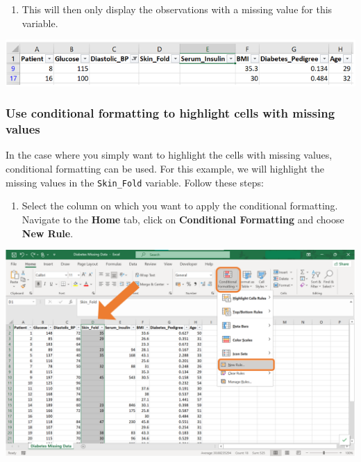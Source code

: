 \documentclass[
]{book}
\providecommand{\tightlist}{%
  \setlength{\itemsep}{0pt}\setlength{\parskip}{0pt}}
\begin{document}
\newpage

\begin{enumerate}
\def\labelenumi{\arabic{enumi}.}
\setcounter{enumi}{2}
\tightlist
\item
  This will then only display the observations with a missing value for this variable.
\end{enumerate}

\begin{center}\includegraphics[width=0.8\linewidth]{Figures/missing_1_3} \end{center}

\subsubsection*{Use conditional formatting to highlight cells with missing values}\label{use-conditional-formatting-to-highlight-cells-with-missing-values}

In the case where you simply want to highlight the cells with missing values, conditional formatting can be used. For this example, we will highlight the missing values in the \texttt{Skin\_Fold} variable. Follow these steps:

\begin{enumerate}
\def\labelenumi{\arabic{enumi}.}
\tightlist
\item
  Select the column on which you want to apply the conditional formatting. Navigate to the \textbf{Home} tab, click on \textbf{Conditional Formatting} and choose \textbf{New Rule}.
\end{enumerate}

\begin{center}\includegraphics[width=0.8\linewidth]{Figures/missing_2_1} \end{center}
\end{document}
